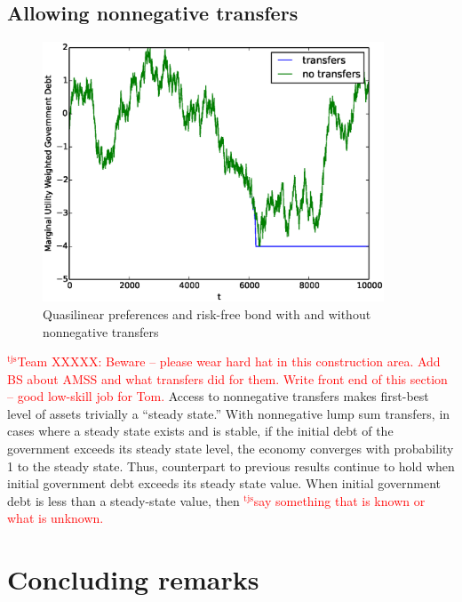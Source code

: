 \documentclass[12pt]{article}
\newcommand{\tjs}[1]{\textcolor{red}{$^{\textrm{tjs}}${#1}}}
\begin{document}
\subsection{Allowing nonnegative transfers}
\begin{figure}[h]
	\begin{center}
	\includegraphics[width=4in]{Images/transfer_example2.eps}
\caption{Quasilinear preferences and risk-free bond  with and without nonnegative transfers}
	\end{center}
\end{figure}
\tjs{Team XXXXX: Beware -- please wear hard hat in this construction area.  Add BS about AMSS and what transfers did for them. Write front end of this section -- good low-skill job for Tom.}
	 Access to nonnegative transfers makes first-best level of assets trivially a ``steady state.''  	
With nonnegative lump sum transfers,  in cases where a steady state exists and is stable,  if the initial debt of the government exceeds its steady state level,  the economy  converges with probability 1 to the steady state. Thus, counterpart to previous  results continue to hold  when
initial government debt exceeds its steady state value.  When initial government debt is less than a steady-state value, then
\tjs{say something that is known or what is unknown.}



\section{Concluding remarks}
\end{document}
